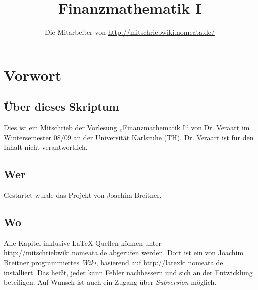 \documentclass[a4paper,twoside,DIV15,BCOR12mm]{scrbook}
\author{Die Mitarbeiter von \url{http://mitschriebwiki.nomeata.de/}}
\title{Finanzmathematik I}
\begin{document}
\maketitle
 
\newenvironment{enuma}{%
\begin{enumerate}[\hspace{1em}a)]%
}{%
\end{enumerate}%
}

\newenvironment{enumi}{%
\begin{enumerate}[\hspace{1em}i)]%
}{%
\end{enumerate}%
}

\setcounter{secnumdepth}{-1}
\tableofcontents


\chapter{Vorwort}
\setcounter{secnumdepth}{2}

\section*{Über dieses Skriptum}
Dies ist ein Mitschrieb der Vorlesung „Finanzmathematik I“ von Dr. Veraart im
Wintersemester 08/09 an der Universität Karlsruhe (TH).
Dr. Veraart ist für  den Inhalt nicht verantwortlich.
\section*{Wer}
Gestartet wurde das Projekt von Joachim Breitner.

\section*{Wo}
Alle Kapitel inklusive \LaTeX-Quellen können unter \url{http://mitschriebwiki.nomeata.de} abgerufen werden.
Dort ist ein von Joachim Breitner programmiertes \emph{Wiki}, basierend auf \url{http://latexki.nomeata.de} installiert. 
Das heißt, jeder kann Fehler nachbessern und sich an der Entwicklung
beteiligen. Auf Wunsch ist auch ein Zugang über \emph{Subversion} möglich.
\end{document}
